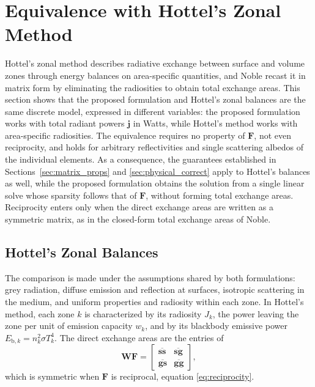 \documentclass[preprint,1p,times]{elsarticle}
\theoremstyle{plain}
\theoremstyle{definition}
\theoremstyle{remark}
\begin{document}
\section{Equivalence with Hottel's Zonal Method}
\label{sec:hottel_equivalence}

Hottel's zonal method \citep{Hottel1958, Hottel1967} describes radiative exchange between surface and volume zones through energy balances on area-specific quantities, and Noble \citep{Noble1975} recast it in matrix form by eliminating the radiosities to obtain total exchange areas. This section shows that the proposed formulation and Hottel's zonal balances are the same discrete model, expressed in different variables: the proposed formulation works with total radiant powers $\mathbf{j}$ in Watts, while Hottel's method works with area-specific radiosities. The equivalence requires no property of $\mathbf{F}$, not even reciprocity, and holds for arbitrary reflectivities and single scattering albedos of the individual elements. As a consequence, the guarantees established in Sections~\ref{sec:matrix_props} and \ref{sec:physical_correct} apply to Hottel's balances as well, while the proposed formulation obtains the solution from a single linear solve whose sparsity follows that of $\mathbf{F}$, without forming total exchange areas. Reciprocity enters only when the direct exchange areas are written as a symmetric matrix, as in the closed-form total exchange areas of Noble.

\subsection{Hottel's Zonal Balances}
\label{sec:hottel_balances}

The comparison is made under the assumptions shared by both formulations: grey radiation, diffuse emission and reflection at surfaces, isotropic scattering in the medium, and uniform properties and radiosity within each zone. In Hottel's method, each zone $k$ is characterized by its radiosity $J_k$, the power leaving the zone per unit of emission capacity $w_k$, and by its blackbody emissive power $E_{\mathrm{b},k} = n_k^2 \sigma T_k^4$. The direct exchange areas are the entries of
\begin{equation}
\mathbf{W}\mathbf{F} =
\begin{bmatrix}
\overline{\mathbf{ss}} & \overline{\mathbf{sg}} \\
\overline{\mathbf{gs}} & \overline{\mathbf{gg}}
\end{bmatrix},
\end{equation}
which is symmetric when $\mathbf{F}$ is reciprocal, equation \eqref{eq:reciprocity}.
\end{document}

